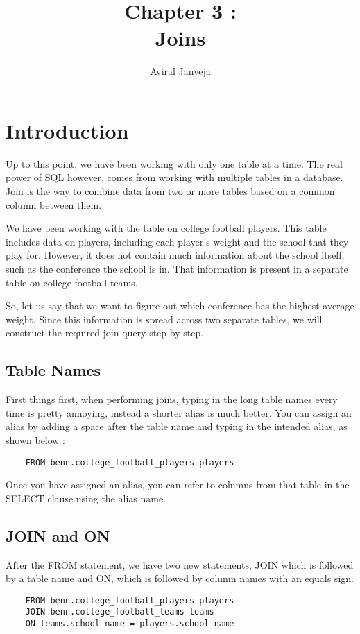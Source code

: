 \documentclass[12pt, letterpaper]{article}
\title{\textbf{\Huge Chapter 3 : \\ Joins}}
\author{Aviral Janveja}
\date{}
\begin{document}
\maketitle


\section{Introduction}
Up to this point, we have been working with only one table at a time. The real power of SQL however, comes from working with multiple tables in a database. Join is the way to combine data from two or more tables based on a common column between them.

We have been working with the table on college football players. This table includes data on players, including each player's weight and the school that they play for. However, it does not contain much information about the school itself, such as the conference the school is in. That information is present in a separate table on college football teams.

So, let us say that we want to figure out which conference has the highest average weight. Since this information is spread across two separate tables, we will construct the required join-query step by step.

\subsection{Table Names}
 First things first, when performing joins, typing in the long table names every time is pretty annoying, instead a shorter alias is much better. You can assign an alias by adding a space after the table name and typing in the intended alias, as shown below : 
 
\begin{verbatim}
    FROM benn.college_football_players players
\end{verbatim}

Once you have assigned an alias, you can refer to columns from that table in the SELECT clause using the alias name.

\subsection{JOIN and ON}
After the FROM statement, we have two new statements, JOIN which is followed by a table name and ON, which is followed by column names with an equals sign.

\begin{verbatim}
    FROM benn.college_football_players players
    JOIN benn.college_football_teams teams
    ON teams.school_name = players.school_name
\end{verbatim}
\end{document}
